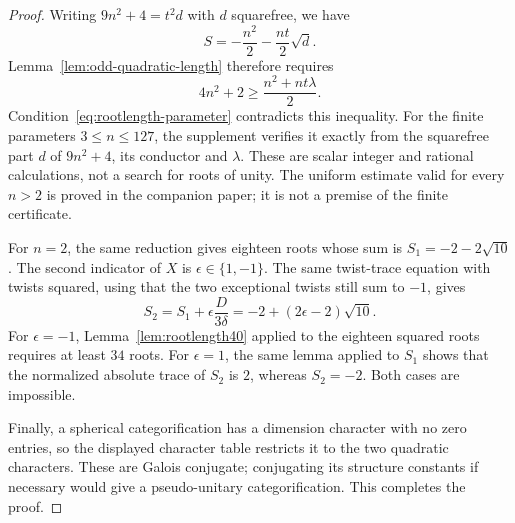 \begin{proof}
Writing $9n^2+4=t^2d$ with $d$ squarefree, we have
\[
 S=-\frac{n^2}{2}-\frac{nt}{2}\sqrt d.
\]
Lemma~\ref{lem:odd-quadratic-length} therefore requires
\[
 4n^2+2\geq\frac{n^2+nt\lambda}{2}.
\]
Condition~\eqref{eq:rootlength-parameter} contradicts this inequality.
For the finite parameters $3\leq n\leq127$, the supplement verifies it
exactly from the squarefree part $d$ of $9n^2+4$, its conductor and
$\lambda$. These are scalar integer and rational calculations, not a
search for roots of unity. The uniform estimate valid for every $n>2$
is proved in the companion paper; it is not a premise of the finite
certificate.

For $n=2$, the same reduction gives eighteen roots whose sum is
$S_1=-2-2\sqrt{10}$. The second indicator of $X$ is
$\epsilon\in\{1,-1\}$. The same twist-trace equation with twists squared,
using that the two exceptional twists still sum to $-1$, gives
\[
 S_2=S_1+\epsilon\frac{D}{3\delta}
     =-2+(2\epsilon-2)\sqrt{10}.
\]
For $\epsilon=-1$, Lemma~\ref{lem:rootlength40} applied to the eighteen
squared roots requires at least $34$ roots. For $\epsilon=1$, the same
lemma applied to $S_1$ shows that the normalized absolute trace of $S_2$
is $2$, whereas $S_2=-2$. Both cases are impossible.

Finally, a spherical categorification has a dimension character with no zero entries,
so the displayed character table restricts it to the two quadratic characters.
These are Galois conjugate; conjugating its structure constants if necessary
would give a pseudo-unitary categorification. This completes the proof.
\end{proof}
